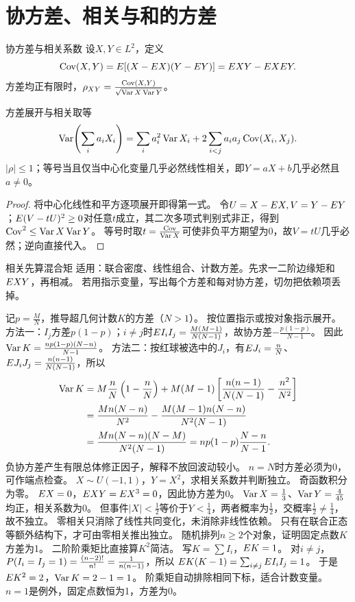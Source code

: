 \section{协方差、相关与和的方差}\label{sec:43}
\begin{definition}{协方差与相关系数}
设$X,Y\in L^2$，定义
\[\operatorname{Cov}(X,Y)=E[(X-E X)(Y-E Y)]=E XY-E XE Y.\]
方差均正有限时，$\rho_{XY}=\frac{\operatorname{Cov}(X,Y)}{\sqrt{\operatorname{Var} X\operatorname{Var} Y}}$。
\end{definition}
\begin{theorem}{方差展开与相关取等}
\[\operatorname{Var}\!\left(\sum_i a_iX_i\right)=\sum_i a_i^2\operatorname{Var} X_i+2\sum_{i<j}a_ia_j\operatorname{Cov}(X_i,X_j).\]
$|\rho|\le1$；等号当且仅当中心化变量几乎必然线性相关，即$Y=aX+b$几乎必然且$a\ne0$。
\end{theorem}
\begin{proof}
将中心化线性和平方逐项展开即得第一式。
令$U=X-E X,V=Y-E Y$；$E(V-tU)^2\ge0$对任意$t$成立，其二次多项式判别式非正，得到$\operatorname{Cov}^2\le\operatorname{Var} X\operatorname{Var} Y$。
等号时取$t=\frac{\operatorname{Cov}}{\operatorname{Var} X}$可使非负平方期望为0，故$V=tU$几乎必然；逆向直接代入。
\end{proof}
\begin{method}{相关先算混合矩}
适用：联合密度、线性组合、计数方差。先求一二阶边缘矩和$E XY$，再相减。
若用指示变量，写出每个方差和每对协方差，切勿把依赖项丢掉。
\end{method}
{记$p=\frac{M}{N}$，推导超几何计数$K$的方差（$N>1$）。}
{按位置指示或按对象指示展开。}
{方法一：$I_j$方差$p(1-p)$；$i\ne j$时$E I_iI_j=\frac{M(M-1)}{N(N-1)}$，故协方差$-\frac{p(1-p)}{N-1}$。
因此$\operatorname{Var} K=\frac{np(1-p)(N-n)}{N-1}$。
方法二：按红球被选中的$J_i$，有$E J_i=\frac{n}{N}$、$E J_iJ_j=\frac{n(n-1)}{N(N-1)}$，所以
\begin{align*}
\operatorname{Var} K&=M\dfrac nN\left(1-\dfrac nN\right)
+M(M-1)\left[\dfrac{n(n-1)}{N(N-1)}-\dfrac{n^2}{N^2}\right]\\
&=\dfrac{Mn(N-n)}{N^2}-\dfrac{M(M-1)n(N-n)}{N^2(N-1)}\\
&=\dfrac{Mn(N-n)(N-M)}{N^2(N-1)}
=np(1-p)\dfrac{N-n}{N-1}.
\end{align*}}
{负协方差产生有限总体修正因子，解释不放回波动较小。}
{$n=N$时方差必须为0，可作端点检查。}
{$X\sim U(-1,1)$，$Y=X^2$，求相关系数并判断独立。}
{奇函数积分为零。}
{$E X=0$，$E XY=E X^3=0$，因此协方差为0。
$\operatorname{Var} X=\frac{1}{3}$、$\operatorname{Var} Y=\frac{4}{45}$均正，相关系数为0。
但事件$|X|<\frac{1}{2}$等价于$Y<\frac{1}{4}$，两者概率为$\frac{1}{2}$，交概率$\frac{1}{2}\ne\frac{1}{4}$，故不独立。}
{零相关只消除了线性共同变化，未消除非线性依赖。}
{只有在联合正态等额外结构下，才可由零相关推出独立。}
{随机排列$n\ge2$个对象，证明固定点数$K$方差为1。}
{二阶阶乘矩比直接算$K^2$简洁。}
{写$K=\sum I_i$，$E K=1$。
对$i\ne j$，$P(I_i=I_j=1)=\frac{(n-2)!}{n!}=\frac{1}{n(n-1)}$，所以
$E K(K-1)=\sum_{i\ne j}E I_iI_j=1$。
于是$E K^2=2$，$\operatorname{Var} K=2-1=1$。}
{阶乘矩自动排除相同下标，适合计数变量。}
{$n=1$是例外，固定点数恒为1，方差为0。}

